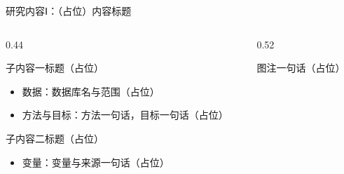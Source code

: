 \documentclass[aspectratio=169,11pt]{beamer}
\begin{document}
\begin{frame}{研究内容Ⅰ：（占位）内容标题}
  \footnotesize
  \begin{columns}[T]
    \begin{column}{0.44\textwidth}
      \begin{point}{子内容一标题（占位）}
        \begin{itemize}
          \item \textcolor{primary}{数据}：数据库名与范围（占位）
          \item \textcolor{primary}{方法与目标}：方法一句话，目标一句话（占位）
        \end{itemize}
      \end{point}
      \begin{point}{子内容二标题（占位）}
        \begin{itemize}
          \item \textcolor{primary}{变量}：变量与来源一句话（占位）
        \end{itemize}
      \end{point}
    \end{column}
    \begin{column}{0.52\textwidth}
      \begin{center}

        \vskip0.8mm
        {\scriptsize\color{muted} 图注一句话（占位）}
      \end{center}
    \end{column}
  \end{columns}
\end{frame}
\end{document}
